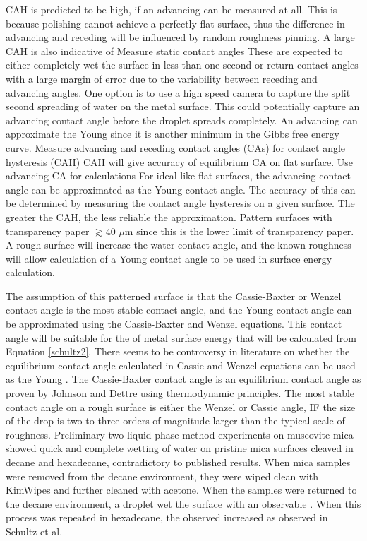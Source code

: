 \begin{outline}[enumerate]
CAH is predicted to be high, if an advancing \ca can be measured at all. This is because polishing cannot achieve a perfectly flat surface, thus the difference in advancing and receding \ca[s] will be influenced by random roughness pinning. A large CAH is also indicative of 
	\2 Measure static contact angles
		\3 These are expected to either completely wet the surface in less than one second or return contact angles with a large margin of error due to the variability between receding and advancing angles. 
		\3 One option is to use a high speed camera to capture the split second spreading of water on the metal surface. This could potentially capture an advancing contact angle before the droplet spreads completely. An advancing \ca can approximate the Young \ca since it is another minimum in the Gibbs free energy curve.
	\2 Measure advancing and receding contact angles (CAs) for contact angle hysteresis (CAH)
		\3 CAH will give accuracy of equilibrium CA on flat surface. 
	\2 Use advancing CA for calculations
		\3 For ideal-like flat surfaces, the advancing contact angle can be approximated as the Young contact angle. The accuracy of this can be determined by measuring the contact angle hysteresis on a given surface. The greater the CAH, the less reliable the approximation. 
\1 Pattern surfaces with transparency paper $\gtrsim$40 $\mu$m since this is the lower limit of transparency paper. A rough surface will increase the water contact angle, and the known roughness will allow calculation of a Young contact angle to be used in surface energy calculation. 



	\2 The assumption of this patterned surface is that the Cassie-Baxter or Wenzel contact angle is the most stable contact angle, and the Young contact angle can be approximated using the Cassie-Baxter and Wenzel equations. This contact angle will be suitable for the of metal surface energy that will be calculated from Equation \ref{schultz2}.
		\3 There seems to be controversy in literature on whether the equilibrium contact angle calculated in Cassie and Wenzel equations can be used as the Young \ca.\cite{Attension2015,Marmur2009b,Bracco2013}
		\3 The Cassie-Baxter contact angle is an equilibrium contact angle as proven by Johnson and Dettre using thermodynamic principles.\cite{Johnson1964}
		\3 The most stable contact angle on a rough surface is either the Wenzel or Cassie angle, IF the size of the drop is two to three orders of magnitude larger than the typical scale of roughness.\cite{Meiron2004} %
	\2 Preliminary two-liquid-phase method experiments on muscovite mica showed quick and complete wetting of water on pristine mica surfaces cleaved in decane and hexadecane, contradictory to published results.\cite{Schultz1992} When mica samples were removed from the decane environment, they were wiped clean with KimWipes and further cleaned with acetone. When the samples were returned to the decane environment, a droplet wet the surface with an observable \ca. When this process was repeated in hexadecane, the observed \ca increased as observed in Schultz et al.\cite{Schultz1992} 
	

\end{outline}
